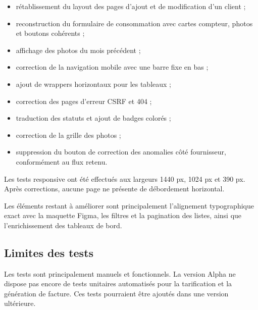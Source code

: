 \begin{itemize}[leftmargin=*]
  \item rétablissement du layout des pages d'ajout et de modification d'un client ;
  \item reconstruction du formulaire de consommation avec cartes compteur, photos et boutons cohérents ;
  \item affichage des photos du mois précédent ;
  \item correction de la navigation mobile avec une barre fixe en bas ;
  \item ajout de wrappers horizontaux pour les tableaux ;
  \item correction des pages d'erreur CSRF et 404 ;
  \item traduction des statuts et ajout de badges colorés ;
  \item correction de la grille des photos ;
  \item suppression du bouton de correction des anomalies côté fournisseur, conformément au flux retenu.
\end{itemize}

Les tests responsive ont été effectués aux largeurs 1440 px, 1024 px et 390 px. Après corrections, aucune page ne présente de débordement horizontal.

Les éléments restant à améliorer sont principalement l'alignement typographique exact avec la maquette Figma, les filtres et la pagination des listes, ainsi que l'enrichissement des tableaux de bord.

\subsection{Limites des tests}

Les tests sont principalement manuels et fonctionnels. La version Alpha ne dispose pas encore de tests unitaires automatisés pour la tarification et la génération de facture. Ces tests pourraient être ajoutés dans une version ultérieure.

